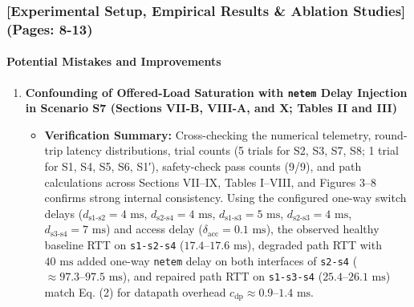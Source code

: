 \documentclass[11pt,a4paper]{article}
\begin{document}
\subsubsection*{[Experimental Setup, Empirical Results \& Ablation Studies] (Pages: 8-13)}
\paragraph{Potential Mistakes and Improvements}
\begin{enumerate}[leftmargin=1.6em,itemsep=3pt]
\item \textbf{Confounding of Offered-Load Saturation with \texttt{netem} Delay Injection in Scenario S7 (Sections VII-B, VIII-A, and X; Tables II and III)}
\begin{itemize}[leftmargin=1.8em,itemsep=2pt]
\item \textbf{Verification Summary:} Cross-checking the numerical telemetry, round-trip latency distributions, trial counts (5 trials for S2, S3, S7, S8; 1 trial for S1, S4, S5, S6, S1′), safety-check pass counts (9/9), and path calculations across Sections VII–IX, Tables I–VIII, and Figures 3–8 confirms strong internal consistency. Using the configured one-way switch delays ($d_{\text{s1-s2}} = 4\text{ ms}$, $d_{\text{s2-s4}} = 4\text{ ms}$, $d_{\text{s1-s3}} = 5\text{ ms}$, $d_{\text{s2-s3}} = 4\text{ ms}$, $d_{\text{s3-s4}} = 7\text{ ms}$) and access delay ($\delta_{\text{acc}} = 0.1\text{ ms}$), the observed healthy baseline RTT on \texttt{s1-s2-s4} ($17.4\text{--}17.6\text{ ms}$), degraded path RTT with $40\text{ ms}$ added one-way \texttt{netem} delay on both interfaces of \texttt{s2-s4} ($\approx 97.3\text{--}97.5\text{ ms}$), and repaired path RTT on \texttt{s1-s3-s4} ($25.4\text{--}26.1\text{ ms}$) match Eq. (2) for datapath overhead $c_{\text{dp}} \approx 0.9\text{--}1.4\text{ ms}$.

\end{itemize}
\end{enumerate}
\end{document}
